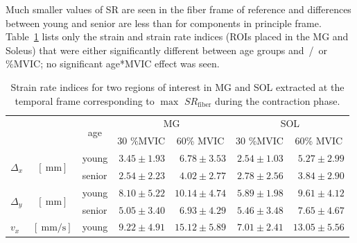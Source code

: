 Much smaller values of SR are seen in the fiber frame of reference and differences between young and senior are less than for components in principle frame. 
Table~\ref{tab: CSYO1} lists only the strain and strain rate indices (ROIs placed in the MG and Soleus) that were either significantly different between age groups and~/~or \%MVIC; no significant age*MVIC effect was seen.
\begin{table}[!htb]
\vspace{+0.2cm}
\caption[Strain rate indices for two regions of interest in MG and SOL extracted at the the peak of the contraction]{Strain rate indices for two regions of interest in MG and SOL extracted at the temporal frame corresponding to $\max$ $SR_{\mathrm{fiber}}$ during the contraction phase.}
\label{tab: CSYO1}
\begin{center}
\begin{threeparttable}
\begin{tabular}{@{}lclrrrr@{}}
\toprule[1pt]\midrule[0.3pt]
\multicolumn{2}{l}{\multirow{2}{*}{}} & \multicolumn{1}{c}{\multirow{2}{*}{age}} & \multicolumn{2}{c}{MG}                                      &  \multicolumn{2}{c}{SOL}                                     \\ \cmidrule(lr){4-5} \cmidrule(lr){6-7} 
\multicolumn{2}{l}{}                  & \multicolumn{1}{c}{}                           & \multicolumn{1}{c}{30 \%MVIC} & \multicolumn{1}{c}{60\% MVIC} &  \multicolumn{1}{c}{30 \%MVIC} & \multicolumn{1}{c}{60\% MVIC} \\ \midrule[0.3pt]
\multirow{2}{*}{$\Delta_x$}\tnote{$1$, $2$, $4$}				& \multirow{2}{*}{$\left[\SI{}{\milli\meter}\right]$}   		 	& young     & $3.45 \pm 1.93$   & $6.78 \pm 3.53$  &  $2.54 \pm 1.03$  & $5.27 \pm 2.99$   \\
	  	  													&                  							     				& senior    & $2.54 \pm 2.23$   & $4.02 \pm 2.77$  &  $2.78 \pm 2.56$  & $3.84 \pm 2.90$   \\[4pt]
\multirow{2}{*}{$\Delta_y$}\tnote{$1$, $4$}					& \multirow{2}{*}{$\left[\SI{}{\milli\meter}\right]$}	   		& young     & $8.10 \pm 5.22$   & $10.14 \pm 4.74$ &  $5.89 \pm 1.98$  & $9.61 \pm 4.12$   \\
						    								&                   							     			  	& senior    & $5.05 \pm 3.40$   & $6.93 \pm 4.29$  &  $5.46 \pm 3.48$  & $7.65 \pm 4.67$   \\[4pt]
\multirow{2}{*}{$v_x$}\tnote{$1$, $2$, $4$}					& \multirow{2}{*}{$\left[\SI{}{\milli\meter/\second}\right]$} 	& young     & $9.22 \pm 4.91$   & $15.12 \pm 5.89$ &  $7.01 \pm 2.41$  & $13.05 \pm 5.56$  \\

\end{tabular}
\end{threeparttable}
\end{center}
\end{table}
